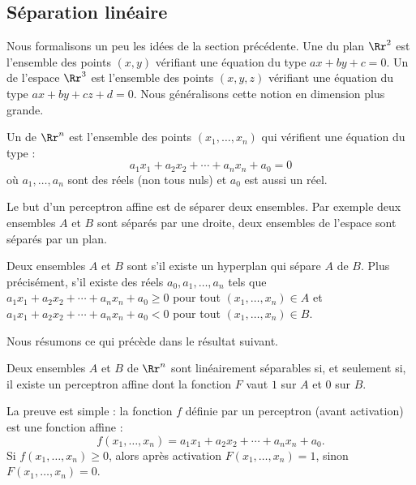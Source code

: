\documentclass[11pt,class=report,crop=false]{standalone}
\begin{document}
\subsection{Séparation linéaire}

Nous formalisons un peu les idées de la section précédente.
Une  du plan $\Rr^2$ est l'ensemble des points $(x,y)$ vérifiant une équation du type $ax+by+c=0$. Un  de l'espace $\Rr^3$ est l'ensemble des points $(x,y,z)$ vérifiant une équation du type $ax+by+cz+d=0$.  Nous généralisons cette notion en dimension plus grande.
\begin{definition}
Un  de $\Rr^n$ est l'ensemble des points $(x_1,\ldots,x_n)$ qui vérifient une équation du type :
$$a_1 x_1 + a_2 x_2 + \cdots + a_n x_n + a_0=0$$
où $a_1,\ldots,a_n$ sont des réels (non tous nuls) et $a_0$ est aussi un réel.
\end{definition}


Le but d'un perceptron affine est de séparer deux ensembles. Par exemple deux ensembles $A$ et $B$ sont séparés par une droite, deux ensembles de l'espace sont séparés par un plan.

\begin{definition}
Deux ensembles $A$ et $B$ sont  s'il existe un hyperplan qui sépare $A$ de $B$. Plus précisément, s'il existe des réels  $a_0,a_1,\ldots,a_n$ tels que $a_1 x_1 + a_2 x_2 + \cdots + a_n x_n + a_0 \ge 0$ pour tout $(x_1,\ldots,x_n) \in A$ et $a_1 x_1 + a_2 x_2 + \cdots + a_n x_n + a_0 < 0$ pour tout $(x_1,\ldots,x_n) \in B$.
\end{definition}


Nous résumons ce qui précède dans le résultat suivant.
\begin{proposition}
Deux ensembles $A$ et $B$ de $\Rr^n$ sont linéairement séparables si, et seulement si, il existe un perceptron affine dont la fonction $F$ vaut $1$ sur $A$ et $0$ sur $B$.
\end{proposition}

La preuve est simple : la fonction $f$ définie par un perceptron (avant activation) est une fonction affine :
$$f(x_1,\ldots,x_n) = a_1 x_1 + a_2 x_2 + \cdots + a_n x_n + a_0.$$
Si $f(x_1,\ldots,x_n) \ge 0$, alors après activation $F(x_1,\ldots,x_n)=1$, sinon $F(x_1,\ldots,x_n)=0$.
\end{document}
